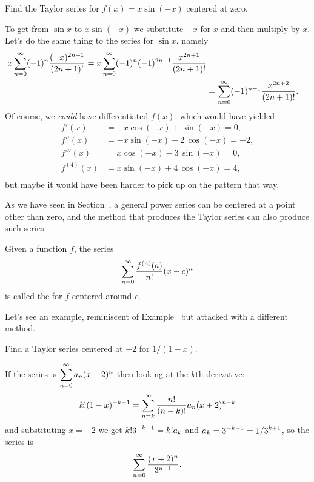 \begin{example}\label{example:substitute-in-polynomial-to-taylor-series}
  Find the Taylor series for $f(x) = x\sin(-x)$ centered at zero.
\end{example}
\begin{solution}
To get from $\sin x$ to $x\sin(-x)$ we substitute $-x$ for $x$ and
then multiply by $x$.  Let's do the same thing to the series for $\sin
x$, namely
\begin{align*}
  x\sum_{n=0}^\infty (-1)^n{(-x)^{2n+1}\over (2n+1)!} =x\sum_{n=0}^\infty (-1)^{n}(-1)^{2n+1}{x^{2n+1}\over (2n+1)!} \\
  &=\sum_{n=0}^\infty (-1)^{n+1}{x^{2n+2}\over (2n+1)!}.
\end{align*}
Of course, we \textit{could} have differentiated $f(x)$, which would have yielded
\begin{align*}
f'(x) &= -x \cos\left(-x\right) + \sin\left(-x\right) = 0, \\
f''(x) &= -x \sin\left(-x\right) - 2 \, \cos\left(-x\right) = -2, \\
f'''(x) &= x \cos\left(-x\right) - 3 \, \sin\left(-x\right) = 0, \\
f^{(4)}(x) &= x \sin\left(-x\right) + 4 \, \cos\left(-x\right) = 4, \\
\end{align*}
but maybe it would have been harder to pick up on the pattern that way.
\end{solution}

As we have seen in
Section~, a general
power series can be centered at a point other than zero, and the
method that produces the Taylor series can also produce such series.
\begin{definition}\label{defn:taylor-series}
Given a function $f$, the series
$$\sum_{n=0}^\infty {f^{(n)}(a)\over n!}(x-c)^n$$
is called the  for $f$ centered around $c$.
\end{definition}

Let's see an example, reminiscent of
Example~ but
attacked with a different method.
\begin{example}\label{example:taylor-series-centered-at-minus-two}
  Find a Taylor series centered at $-2$ for $1/(1-x)$.
\end{example}

\begin{solution}
If the series is $\displaystyle\sum_{n=0}^\infty a_n(x+2)^n$ then looking at the
$k$th derivative:
$$k!(1-x)^{-k-1}=\sum_{n=k}^\infty {n!\over (n-k)!}a_n(x+2)^{n-k}$$
and substituting $x=-2$ we get
$\displaystyle k!3^{-k-1}=k!a_k$ and $\displaystyle a_k=3^{-k-1}=1/3^{k+1}$, so the series is
$$\sum_{n=0}^\infty {(x+2)^n\over 3^{n+1}}.$$
\end{solution}

